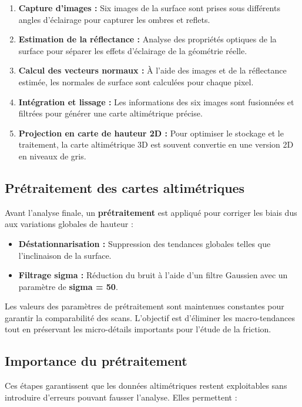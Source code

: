 \begin{enumerate}
    \item \textbf{Capture d’images :} Six images de la surface sont prises sous différents angles d’éclairage pour capturer les ombres et reflets.
    \item \textbf{Estimation de la réflectance :} Analyse des propriétés optiques de la surface pour séparer les effets d’éclairage de la géométrie réelle.
    \item \textbf{Calcul des vecteurs normaux :} À l’aide des images et de la réflectance estimée, les normales de surface sont calculées pour chaque pixel.
    \item \textbf{Intégration et lissage :} Les informations des six images sont fusionnées et filtrées pour générer une carte altimétrique précise.
    \item \textbf{Projection en carte de hauteur 2D :} Pour optimiser le stockage et le traitement, la carte altimétrique 3D est souvent convertie en une version 2D en niveaux de gris.
\end{enumerate}

\subsection{Prétraitement des cartes altimétriques}
Avant l’analyse finale, un \textbf{prétraitement} est appliqué pour corriger les biais dus aux variations globales de hauteur :

\begin{itemize}
    \item \textbf{Déstationnarisation :} Suppression des tendances globales telles que l’inclinaison de la surface.
    \item \textbf{Filtrage sigma :} Réduction du bruit à l’aide d’un filtre Gaussien avec un paramètre de \textbf{sigma = 50}.
\end{itemize}

Les valeurs des paramètres de prétraitement sont maintenues constantes pour garantir la comparabilité des scans. L’objectif est d’éliminer les macro-tendances tout en préservant les micro-détails importants pour l’étude de la friction.

\subsection{Importance du prétraitement}
Ces étapes garantissent que les données altimétriques restent exploitables sans introduire d’erreurs pouvant fausser l’analyse. Elles permettent :

